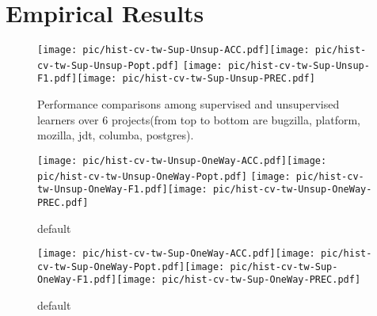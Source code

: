 \section{Empirical Results}


\begin{figure*}[htbp]
\begin{center}
    \texttt{[image: pic/hist-cv-tw-Sup-Unsup-ACC.pdf]}\texttt{[image: pic/hist-cv-tw-Sup-Unsup-Popt.pdf]}
    \texttt{[image: pic/hist-cv-tw-Sup-Unsup-F1.pdf]}\texttt{[image: pic/hist-cv-tw-Sup-Unsup-PREC.pdf]}
\caption{Performance comparisons among supervised and unsupervised learners over 6 projects(from top to bottom are  bugzilla, platform, mozilla, jdt, columba, postgres). } 
\label{default}
\end{center}
\end{figure*}


\begin{figure*}[htbp]
\begin{center}
 \texttt{[image: pic/hist-cv-tw-Unsup-OneWay-ACC.pdf]}\texttt{[image: pic/hist-cv-tw-Unsup-OneWay-Popt.pdf]}
 \texttt{[image: pic/hist-cv-tw-Unsup-OneWay-F1.pdf]}\texttt{[image: pic/hist-cv-tw-Unsup-OneWay-PREC.pdf]}
\caption{default}
\label{default}
\end{center}
\end{figure*}


\begin{figure*}[htbp]
\begin{center}
 \texttt{[image: pic/hist-cv-tw-Sup-OneWay-ACC.pdf]}\texttt{[image: pic/hist-cv-tw-Sup-OneWay-Popt.pdf]}\texttt{[image: pic/hist-cv-tw-Sup-OneWay-F1.pdf]}\texttt{[image: pic/hist-cv-tw-Sup-OneWay-PREC.pdf]}
\caption{default}
\label{default}
\end{center}
\end{figure*}

